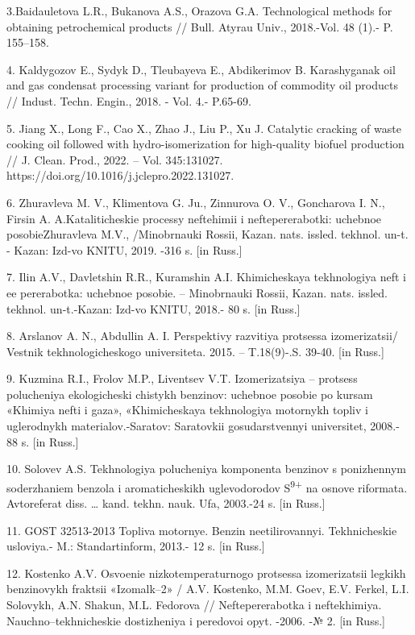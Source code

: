 3.Baidauletova L.R., Bukanova A.S., Orazova G.A. Technological methods
for obtaining petrochemical products // Bull. Atyrau Univ., 2018.-Vol.
48 (1).- P. 155--158.

4. Kaldygozov E., Sydyk D., Tleubayeva E., Abdikerimov B. Karashyganak
oil and gas condensat processing variant for production of commodity oil
products // Indust. Techn. Engin., 2018. - Vol. 4.- P.65-69.

5. Jiang X., Long F., Cao X., Zhao J., Liu P., Xu J. Catalytic cracking
of waste cooking oil followed with hydro-isomerization for high-quality
biofuel production // J. Clean. Prod., 2022. -- Vol. 345:131027.
https://doi.org/10.1016/j.jclepro.2022.131027.

6. Zhuravleva M. V., Klimentova G. Ju., Zinnurova O. V., Goncharova I.
N., Firsin A. A.Kataliticheskie processy neftehimii i neftepererabotki:
uchebnoe posobieZhuravleva M.V., /Minobrnauki Rossii, Kazan. nats.
issled. tekhnol. un-t. - Kazan\textquotesingle: Izd-vo KNITU, 2019. -316
s. {[}in Russ.{]}

7. Il\textquotesingle in A.V., Davletshin R.R., Kuramshin A.I.
Khimicheskaya tekhnologiya neft\textquotesingle{} i ee pererabotka:
uchebnoe posobie. -- Minobrnauki Rossii, Kazan. nats. issled. tekhnol.
un-t.-Kazan\textquotesingle: Izd-vo KNITU, 2018.- 80 s. {[}in Russ.{]}

8. Arslanov A. N., Abdullin A. I. Perspektivy razvitiya protsessa
izomerizatsii/ Vestnik tekhnologicheskogo universiteta. 2015. --
T.18(9)-.S. 39-40. {[}in Russ.{]}

9. Kuz\textquotesingle mina R.I., Frolov M.P., Liventsev V.T.
Izomerizatsiya -- protsess polucheniya ekologicheski chistykh benzinov:
uchebnoe posobie po kursam «Khimiya nefti i gaza», «Khimicheskaya
tekhnologiya motornykh topliv i uglerodnykh materialov.-Saratov:
Saratovkii gosudarstvennyi universitet, 2008.- 88 s. {[}in Russ.{]}

10. Solov\textquotesingle ev A.S. Tekhnologiya polucheniya komponenta
benzinov s ponizhennym soderzhaniem benzola i aromaticheskikh
uglevodorodov S\textsuperscript{9+} na osnove riformata. Avtoreferat
diss. \ldots{} kand. tekhn. nauk. Ufa, 2003.-24 s. {[}in Russ.{]}

11. GOST 32513-2013 Topliva motornye. Benzin neetilirovannyi.
Tekhnicheskie usloviya.- M.: Standartinform, 2013.- 12 s. {[}in Russ.{]}

12. Kostenko A.V. Osvoenie nizkotemperaturnogo protsessa izomerizatsii
legkikh benzinovykh fraktsii «Izomalk--2» / A.V. Kostenko, M.M. Goev,
E.V. Ferkel\textquotesingle, L.I. Solovykh, A.N. Shakun, M.L. Fedorova
// Neftepererabotka i neftekhimiya. Nauchno--tekhnicheskie dostizheniya
i peredovoi opyt. -2006. -№ 2. {[}in Russ.{]}

